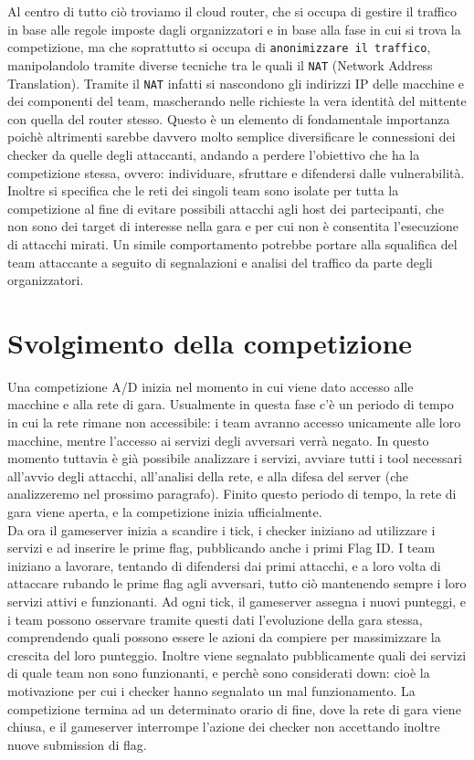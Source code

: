 Al centro di tutto ciò troviamo il cloud router, che si occupa di gestire il traffico in base alle regole imposte dagli organizzatori e in base alla fase in cui si trova la competizione, ma che soprattutto si occupa di \texttt{anonimizzare il traffico}, manipolandolo tramite diverse tecniche tra le quali il \texttt{NAT} (Network Address Translation). Tramite il \texttt{NAT} infatti si nascondono gli indirizzi IP delle macchine e dei componenti del team, mascherando nelle richieste la vera identità del mittente con quella del router stesso. Questo è un elemento di fondamentale importanza poichè altrimenti sarebbe davvero molto semplice diversificare le connessioni dei checker da quelle degli attaccanti, andando a perdere l'obiettivo che ha la competizione stessa, ovvero: individuare, sfruttare e difendersi dalle vulnerabilità.\\

Inoltre si specifica che le reti dei singoli team sono isolate per tutta la competizione al fine di evitare possibili attacchi agli host dei partecipanti, che non sono dei target di interesse nella gara e per cui non è consentita l'esecuzione di attacchi mirati.
Un simile comportamento potrebbe portare alla squalifica del team attaccante a seguito di segnalazioni e analisi del traffico da parte degli organizzatori.

\section{Svolgimento della competizione}

Una competizione A/D inizia nel momento in cui viene dato accesso alle macchine e alla rete di gara. Usualmente in questa fase c'è un periodo di tempo in cui la rete rimane non accessibile: i team avranno accesso unicamente alle loro macchine, mentre l'accesso ai servizi degli avversari verrà negato. In questo momento tuttavia è già possibile analizzare i servizi, avviare tutti i tool necessari all'avvio degli attacchi, all'analisi della rete, e alla difesa del server (che analizzeremo nel prossimo paragrafo). Finito questo periodo di tempo, la rete di gara viene aperta, e la competizione inizia ufficialmente.\\

Da ora il gameserver inizia a scandire i tick, i checker iniziano ad utilizzare i servizi e ad inserire le prime flag, pubblicando anche i primi Flag ID.\@
I team iniziano a lavorare, tentando di difendersi dai primi attacchi, e a loro volta di attaccare rubando le prime flag agli avversari, tutto ciò mantenendo sempre i loro servizi attivi e funzionanti. Ad ogni tick, il gameserver assegna i nuovi punteggi, e i team possono osservare tramite questi dati l'evoluzione della gara stessa, comprendendo quali possono essere le azioni da compiere per massimizzare la crescita del loro punteggio.
Inoltre viene segnalato pubblicamente quali dei servizi di quale team non sono funzionanti, e perchè sono considerati down: cioè la motivazione per cui i checker hanno segnalato un mal funzionamento.
La competizione termina ad un determinato orario di fine, dove la rete di gara viene chiusa, e il gameserver interrompe l'azione dei checker non accettando inoltre nuove submission di flag.\\

